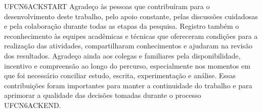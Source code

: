 UFCN6ACKSTART Agradeço às pessoas que contribuíram para o desenvolvimento deste trabalho, pelo apoio constante, pelas discussões cuidadosas e pela colaboração durante todas as etapas da pesquisa. Registro também o reconhecimento às equipes acadêmicas e técnicas que ofereceram condições para a realização das atividades, compartilharam conhecimentos e ajudaram na revisão dos resultados. Agradeço ainda aos colegas e familiares pela disponibilidade, incentivo e compreensão ao longo do percurso, especialmente nos momentos em que foi necessário conciliar estudo, escrita, experimentação e análise. Essas contribuições foram importantes para manter a continuidade do trabalho e para aprimorar a qualidade das decisões tomadas durante o processo UFCN6ACKEND.
